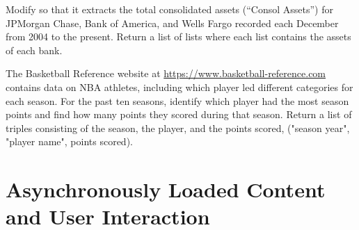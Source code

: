 
\begin{problem} %
Modify  so that it extracts the total consolidated assets (``Consol Assets'') for JPMorgan Chase, Bank of America, and Wells Fargo recorded each December from 2004 to the present.
Return a list of lists where each list contains the assets of each bank.
\end{problem}

\begin{problem} %
The Basketball Reference website at \url{https://www.basketball-reference.com} contains data on NBA athletes, including which player led different categories for each season.
For the past ten seasons, identify which player had the most season points and find how many points they scored during that season.
Return a list of triples consisting of the season, the player, and the points scored, ("season year", "player name", points scored).
\end{problem}

\begin{comment} %
\begin{enumerate}
\item Load \url{http://www.google.com/finance} into BeautifulSoup.
Towards the bottom of the web page, there is a Sector summary.
Go through each sector and locate the top five Gainers.
In a SQL table, store the Name, abbreviation, \% Change, and Mkt Cap of the top Gainer for each Sector.

\item Load  into BeautifulSoup.
Go through the top five offensive leaders.
In a SQL table, store the name, career games played, career mins per game, career points per game, and career FG\% for each player.

\item Load \url{http://www.foxsports.com/soccer/united-states-women-team-stats} into BeautifulSoup.
Go though each player on the World Cup US women's team.
In a SQL table, store the name, hometown, position, and \# of games played in the World Cup.
\end{enumerate}
\end{comment}

\section*{Asynchronously Loaded Content and User Interaction} %

